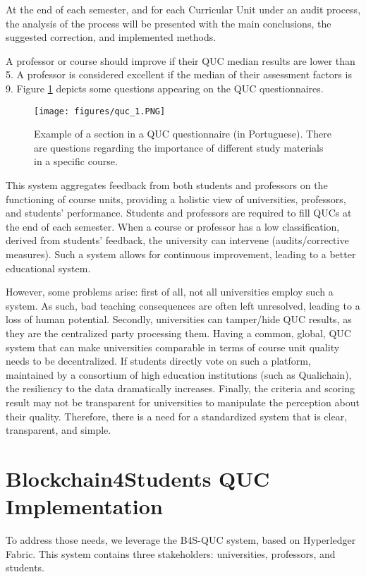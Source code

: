 \documentclass[12pt,a4paper]{article}
\theoremstyle{definition}
\begin{document}
At the end of each semester, and for each Curricular Unit under an audit process, the analysis of the process will be presented with the main conclusions, the suggested correction, and implemented methods.

A professor or course should improve if their QUC median results are lower than 5. A professor is considered excellent if the median of their assessment factors is 9. Figure \ref{fig:quc1} depicts some questions appearing on the QUC questionnaires.

\begin{figure}
\centering
\texttt{[image: figures/quc\_1.PNG]}
\caption{Example of a section in a QUC questionnaire (in Portuguese). There are questions regarding the importance of different study materials in a specific course.}
\label{fig:quc1}
\end{figure}

This system aggregates feedback from both students and professors on the functioning of course units, providing a holistic view of universities, professors, and students' performance. Students and professors are required to fill QUCs at the end of each semester. When a course or professor has a low classification, derived from students' feedback, the university can intervene (audits/corrective measures). Such a system allows for continuous improvement, leading to a better educational system.

However, some problems arise: first of all, not all universities employ such a system. As such, bad teaching consequences are often left unresolved, leading to a loss of human potential. Secondly, universities can tamper/hide QUC results, as they are the centralized party processing them. Having a common, global, QUC system that can make universities comparable in terms of course unit quality needs to be decentralized. If students directly vote on such a platform, maintained by a consortium of high education institutions (such as Qualichain), the resiliency to the data dramatically increases. Finally, the criteria and scoring result may not be transparent for universities to manipulate the perception about their quality. Therefore, there is a need for a standardized system that is clear, transparent, and simple.

\section{Blockchain4Students QUC Implementation}
To address those needs, we leverage the B4S-QUC system, based on Hyperledger Fabric. This system contains three stakeholders: universities, professors, and students.
\end{document}
